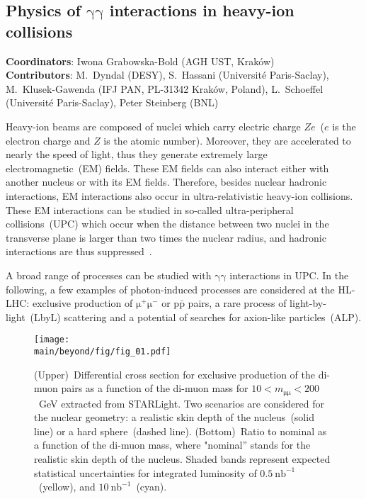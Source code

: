 \subsection{Physics of $\mathrm{\gamma \gamma}$ interactions in heavy-ion collisions}
\label{sec:upc}

{ \small
\noindent \textbf{Coordinators}: Iwona Grabowska-Bold (AGH UST, Krak\'ow)\\

\noindent \textbf{Contributors}: 
M.~Dyndal (DESY), 
S.~Hassani (Universit\'e Paris-Saclay), 
M.~Klusek-Gawenda (IFJ PAN, PL-31342 Krak\'ow, Poland), 
L.~Schoeffel (Universit\'e Paris-Saclay), Peter Steinberg (BNL)
}

Heavy-ion beams are composed of nuclei which carry electric charge $Ze$~($e$ is the electron charge and $Z$ is the atomic number). Moreover, they are accelerated to nearly the speed of light, thus they generate extremely large electromagnetic~(EM) fields. These EM fields can also interact either with another nucleus or with its EM fields.
Therefore, besides nuclear hadronic interactions, EM
interactions also occur in ultra-relativistic heavy-ion collisions.
These EM interactions can be studied in so-called ultra-peripheral
collisions~(UPC) which occur when the distance between two nuclei in the transverse plane is larger than two times the nuclear radius, and hadronic interactions are thus suppressed~\cite{Bertulani:2005ru}.

A broad range of processes can be studied with $\mathrm{\gamma\gamma}$ interactions in UPC. In the following, a few examples of photon-induced processes are considered at the HL-LHC: exclusive production of $\mathrm{\mu^+\mu^-}$ or p$\mathrm{\bar{p}}$ pairs, a rare process of light-by-light~(LbyL) scattering and a potential of searches for axion-like particles~(ALP).

\begin{figure}[!hbt]
\centering
\texttt{[image: \\main/beyond/fig/fig\_01.pdf]}
\caption{
(Upper)~Differential cross section for exclusive production of the di-muon pairs as a function of the di-muon mass for
$10<m_{\mathrm{\mu\mu}}<200$~GeV extracted from STARLight. Two
scenarios are considered for the nuclear geometry: a realistic skin
depth of the nucleus~(solid line) or a hard sphere~(dashed
line). (Bottom)~Ratio to nominal as a function of the di-muon mass,
where "nominal'' stands for the realistic skin depth of the nucleus.
 Shaded bands represent expected statistical uncertainties for integrated luminosity of $0.5~\mathrm{nb}^{-1}$~(yellow), and $10~\mathrm{nb}^{-1}$~(cyan).}
\label{fig:mumu}
\end{figure}


